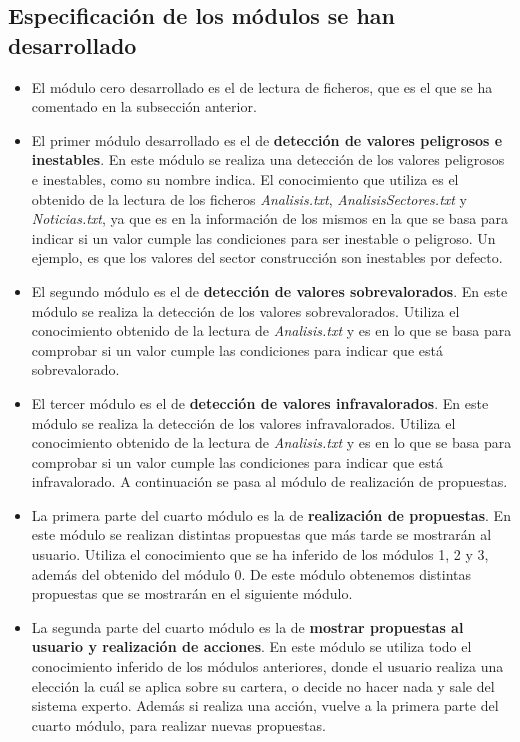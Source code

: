 \subsection{Especificación de los módulos se han desarrollado}
\begin{itemize}
	\item El módulo cero desarrollado es el de lectura de ficheros, que es el que se ha comentado en la subsección anterior.
	\item El primer módulo desarrollado es el de \textbf{detección de valores peligrosos e inestables}. En este módulo se realiza una detección de los valores peligrosos e inestables, como su nombre indica. El conocimiento que utiliza es el obtenido de la lectura de los ficheros \textit{Analisis.txt}, \textit{AnalisisSectores.txt} y \textit{Noticias.txt}, ya que es en la información de los mismos en la que se basa para indicar si un valor cumple las condiciones para ser inestable o peligroso. Un ejemplo, es que los valores del sector construcción son inestables por defecto.
	\item El segundo módulo es el de \textbf{detección de valores sobrevalorados}. En este módulo se realiza la detección de los valores sobrevalorados. Utiliza el conocimiento obtenido de la lectura de \textit{Analisis.txt} y es en lo que se basa para comprobar si un valor cumple las condiciones para indicar que está sobrevalorado.
	\item El tercer módulo es el de \textbf{detección de valores infravalorados}. En este módulo se realiza la detección de los valores infravalorados. Utiliza el conocimiento obtenido de la lectura de \textit{Analisis.txt} y es en lo que se basa para comprobar si un valor cumple las condiciones para indicar que está infravalorado. A continuación se pasa al módulo de realización de propuestas.
	\item La primera parte del cuarto módulo es la de \textbf{realización de propuestas}. En este módulo se realizan distintas propuestas que más tarde se mostrarán al usuario. Utiliza el conocimiento que se ha inferido de los módulos 1, 2 y 3, además del obtenido del módulo 0. De este módulo obtenemos distintas propuestas que se mostrarán en el siguiente módulo.
	\item La segunda parte del cuarto módulo es la de \textbf{mostrar propuestas al usuario y realización de acciones}. En este módulo se utiliza todo el conocimiento inferido de los módulos anteriores, donde el usuario realiza una elección la cuál se aplica sobre su cartera, o decide no hacer nada y sale del sistema experto. Además si realiza una acción, vuelve a la primera parte del cuarto módulo, para realizar nuevas propuestas.
\end{itemize}
